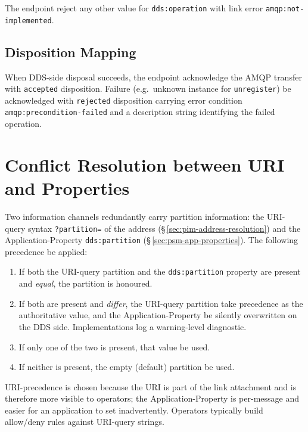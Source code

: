 \documentclass{../styles/zerodds-vendor-spec}
\begin{document}
The endpoint  reject any other value for
\texttt{dds:operation} with link error
\texttt{amqp:not-implemented}.

\subsection{Disposition Mapping}

When DDS-side disposal succeeds, the endpoint 
acknowledge the AMQP transfer with \texttt{accepted} disposition.
Failure (e.g.\ unknown instance for \texttt{unregister}) 
be acknowledged with \texttt{rejected} disposition carrying error
condition \texttt{amqp:precondition-failed} and a description
string identifying the failed operation.

\section{Conflict Resolution between URI and Properties}\label{sec:pim-conflict-resolution}

Two information channels redundantly carry partition information:
the URI-query syntax \texttt{?partition=} of the address
(\S\,\ref{sec:pim-address-resolution}) and the
Application-Property \texttt{dds:partition}
(\S\,\ref{sec:psm-app-properties}). The following precedence
 be applied:

\begin{enumerate}
  \item If both the URI-query partition and the
        \texttt{dds:partition} property are present and \emph{equal},
        the partition is honoured.
  \item If both are present and \emph{differ}, the URI-query
        partition  take precedence as the
        authoritative value, and the Application-Property
         be silently overwritten on the DDS side.
        Implementations  log a warning-level
        diagnostic.
  \item If only one of the two is present, that value
         be used.
  \item If neither is present, the empty (default) partition
         be used.
\end{enumerate}

\begin{specnote}
URI-precedence is chosen because the URI is part of the link
attachment and is therefore more visible to operators; the
Application-Property is per-message and easier for an
application to set inadvertently. Operators typically build
allow/deny rules against URI-query strings.
\end{specnote}
\end{document}

